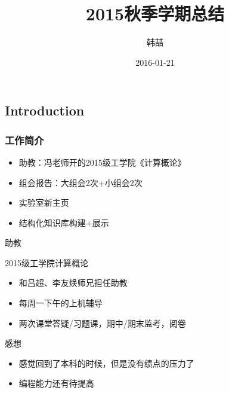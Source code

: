 \documentclass[color=usenames,dvipsnames]{beamer}
\title[2015 Summ]{2015秋季学期总结}
\author{韩喆}
\institute{PIE@WIP}
\date{2016-01-21}
\begin{document}
\begin{frame}
  \titlepage
\end{frame}


\begin{frame}


\section{Introduction}
\frametitle{工作简介}
\begin{itemize}
\item  助教：冯老师开的2015级工学院《计算概论》
\item \color{Green}
 组会报告：大组会2次+小组会2次
\item\color{RedOrange} 实验室新主页
\color{blue}
\item 结构化知识库构建+展示
\end{itemize}
\end{frame}


\begin{frame}{助教}
 \begin{block}{}
  2015级工学院计算概论
 \end{block}

 \begin{itemize}
  \item 和吕超、李友焕师兄担任助教
  \item 每周一下午的上机辅导
  \item 两次课堂答疑/习题课，期中/期末监考，阅卷
 \end{itemize}
 
 \pause
 感想
 \begin{itemize}
  \item 感觉回到了本科的时候，但是没有绩点的压力了
  \item 编程能力还有待提高
 \end{itemize}
\end{frame}
\end{document}
